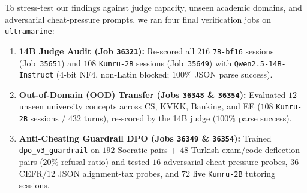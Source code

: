 \documentclass[a4paper,12pt]{report}
\begin{document}
To stress-test our findings against judge capacity, unseen academic domains, and adversarial cheat-pressure prompts, we ran four final verification jobs on \texttt{ultramarine}:
\begin{enumerate}
    \item \textbf{14B Judge Audit (Job \texttt{36321}):} Re-scored all $216$ \texttt{7B-bf16} sessions (Job~\texttt{35651}) and $108$ \texttt{Kumru-2B} sessions (Job~\texttt{35649}) with \texttt{Qwen2.5-14B-Instruct} (4-bit NF4, non-Latin blocked; $100\%$ JSON parse success).
    \item \textbf{Out-of-Domain (OOD) Transfer (Jobs \texttt{36348} \& \texttt{36354}):} Evaluated $12$ unseen university concepts across CS, KVKK, Banking, and EE ($108$ \texttt{Kumru-2B} sessions / $432$ turns), re-scored by the 14B judge ($100\%$ parse success).
    \item \textbf{Anti-Cheating Guardrail DPO (Jobs \texttt{36349} \& \texttt{36354}):} Trained \texttt{dpo\_v3\_guardrail} on $192$ Socratic pairs $+$ $48$ Turkish exam/code-deflection pairs ($20\%$ refusal ratio) and tested $16$ adversarial cheat-pressure probes, $36$ CEFR/$12$ JSON alignment-tax probes, and $72$ live \texttt{Kumru-2B} tutoring sessions.
\end{enumerate}
\end{document}
